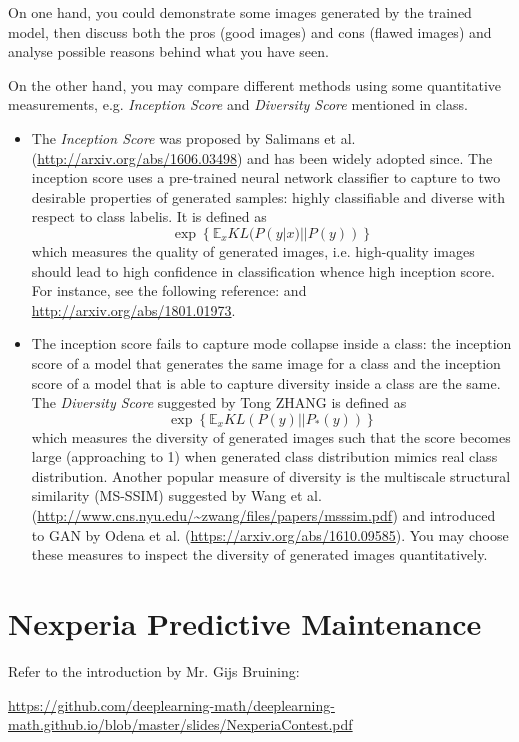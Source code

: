 \documentclass[11pt]{article}
\def\E{{\mathbb E}}
\begin{document}
On one hand, you could demonstrate some images generated by the trained model, then discuss both the pros (good images) and cons (flawed images) and analyse possible reasons behind what you have seen.

On the other hand, you may compare different methods using some quantitative measurements, e.g. \emph{Inception Score} and \emph{Diversity Score} mentioned in class. 
\begin{itemize}
\item The \emph{Inception Score} was proposed by Salimans et al. (\url{http://arxiv.org/abs/1606.03498}) and has been widely
adopted since. The inception score uses a pre-trained neural network classifier to capture to two
desirable properties of generated samples: highly classifiable and diverse with respect to class labelis. It is defined as
\[ \exp \left \{ \E_x KL(P(y|x)||P(y)) \right\} \]
which measures the quality of generated images, i.e. high-quality images should lead to high confidence in classification whence high inception score. For instance, see the following reference:  and \url{http://arxiv.org/abs/1801.01973}.
\item The inception score fails to capture mode collapse inside a class: the inception score of a model that generates the same image for a class and the
inception score of a model that is able to capture diversity inside a class are the same. The \emph{Diversity Score} suggested by Tong ZHANG is defined as
\[ \exp \left \{ \E_x KL(P(y)||P_*(y)) \right\}  \]
which measures the diversity of generated images such that the score becomes large (approaching to 1) when generated class distribution mimics real class distribution. Another popular measure of diversity is the multiscale structural similarity (MS-SSIM) suggested by Wang et al. (\url{http://www.cns.nyu.edu/~zwang/files/papers/msssim.pdf}) and introduced to GAN by Odena et al. (\url{https://arxiv.org/abs/1610.09585}). You may choose these measures to inspect the diversity of generated images quantitatively. 
\end{itemize}

\section{Nexperia Predictive Maintenance}

Refer to the introduction by Mr. Gijs Bruining:

\url{https://github.com/deeplearning-math/deeplearning-math.github.io/blob/master/slides/NexperiaContest.pdf}
\end{document}
